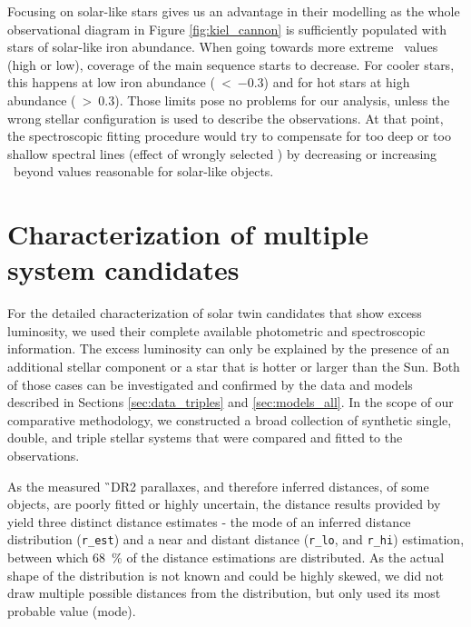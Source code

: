 Focusing on solar-like stars gives us an advantage in their modelling as the whole observational diagram in Figure \ref{fig:kiel_cannon} is sufficiently populated with stars of solar-like iron abundance. When going towards more extreme \Feh\ values (high or low), coverage of the main sequence starts to decrease. For cooler stars, this happens at low iron abundance (\Feh~\textless~$-0.3$) and for hot stars at high abundance (\Feh~\textgreater~$0.3$). Those limits pose no problems for our analysis, unless the wrong stellar configuration is used to describe the observations. At that point, the spectroscopic fitting procedure would try to compensate for too deep or too shallow spectral lines (effect of wrongly selected \Teff) by decreasing or increasing \Feh\ beyond values reasonable for solar-like objects. 

\section{Characterization of multiple system candidates}
\label{sec:multi_fit}
For the detailed characterization of solar twin candidates that show excess luminosity, we used their complete available photometric and spectroscopic information. The excess luminosity can only be explained by the presence of an additional stellar component or a star that is hotter or larger than the Sun. Both of those cases can be investigated and confirmed by the data and models described in Sections \ref{sec:data_triples} and \ref{sec:models_all}. In the scope of our comparative methodology, we constructed a broad collection of synthetic single, double, and triple stellar systems that were compared and fitted to the observations.

As the measured \G\ DR2 parallaxes, and therefore inferred distances, of some objects, are poorly fitted or highly uncertain, the distance results provided by \citet{2018AJ....156...58B} yield three distinct distance estimates - the mode of an inferred distance distribution (\texttt{r\_est}) and a near and distant distance (\texttt{r\_lo}, and \texttt{r\_hi}) estimation, between which 68~\% of the distance estimations are distributed. As the actual shape of the distribution is not known and could be highly skewed, we did not draw multiple possible distances from the distribution, but only used its most probable value (mode).

